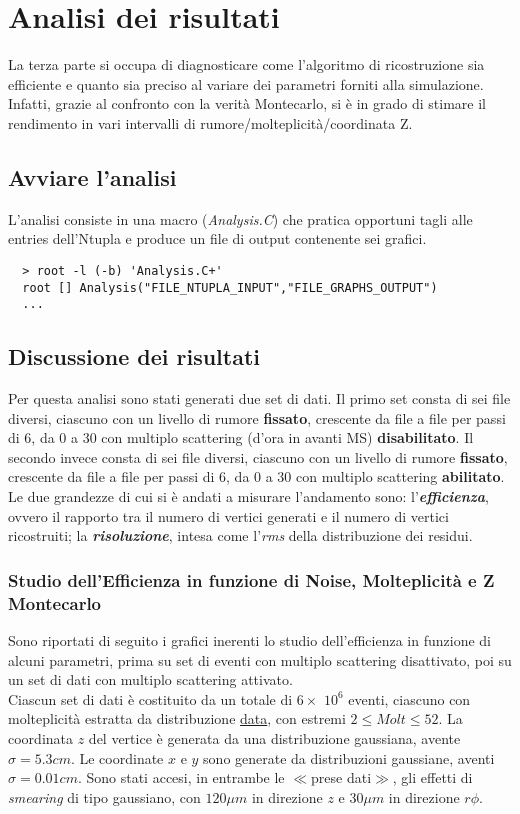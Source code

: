 \documentclass{article}
\begin{document}
\section{Analisi dei risultati}
La terza parte si occupa di diagnosticare come l'algoritmo di ricostruzione sia efficiente e quanto sia preciso al variare dei parametri forniti alla simulazione.
Infatti, grazie al confronto con la verità Montecarlo, si è in grado di stimare il rendimento in vari intervalli di rumore/molteplicità/coordinata Z. 
\subsection{Avviare l'analisi}
\noindent L'analisi consiste in una macro (\textit{Analysis.C}) che pratica opportuni tagli alle entries dell'Ntupla e produce un file di output contenente sei grafici.
\begin{verbatim}
  > root -l (-b) 'Analysis.C+'
  root [] Analysis("FILE_NTUPLA_INPUT","FILE_GRAPHS_OUTPUT")
  ...
\end{verbatim}

\subsection{Discussione dei risultati}
Per questa analisi sono stati generati due set di dati.
Il primo set consta di sei file diversi, ciascuno con un livello di rumore \textbf{fissato}, crescente da file a file per passi di 6, da 0 a 30 con multiplo scattering (d'ora in avanti MS) \textbf{disabilitato}.
Il secondo invece consta di sei file diversi, ciascuno con un livello di rumore \textbf{fissato}, crescente da file a file per passi di 6, da 0 a 30 con multiplo scattering \textbf{abilitato}.
Le due grandezze di cui si è andati a misurare l'andamento sono: l'\textbf{\textit{efficienza}}, ovvero il rapporto tra il numero di vertici generati e il numero di vertici ricostruiti; la \textbf{\textit{risoluzione}}, intesa come l'\textit{rms} della distribuzione dei residui.

\subsubsection{Studio dell'Efficienza in funzione di Noise, Molteplicità e Z Montecarlo}
Sono riportati di seguito i grafici inerenti lo studio dell'efficienza in funzione di alcuni parametri, prima su set di eventi con multiplo scattering disattivato, poi su un set di dati con multiplo scattering attivato.\\
\indent Ciascun set di dati è costituito da un totale di 
$6\times$ $10^{6}$ eventi, ciascuno con molteplicità estratta da distribuzione \href{http://personalpages.to.infn.it/~masera/tans/tans2013/miscellanea/kinem.root}{data}, con estremi $2\leq Molt \leq 52$. La coordinata $z$ del vertice è generata da una distribuzione gaussiana, avente $\sigma=5.3cm$. Le coordinate $x$ e $y$ sono generate da distribuzioni gaussiane, aventi $\sigma=0.01cm$. Sono stati accesi, in entrambe le $\ll$prese dati$\gg$, gli effetti di \textit{smearing} di tipo gaussiano, con $120 \mu m$ in direzione  $z$ e $30 \mu m$ in direzione $r\phi$. 
\end{document}
